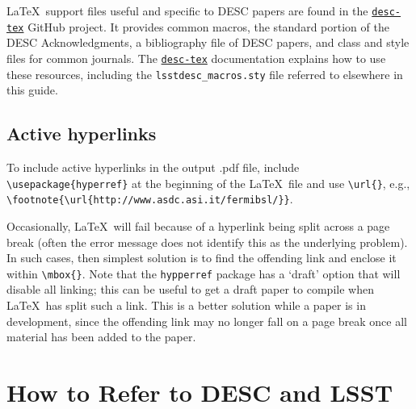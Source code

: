 \documentclass[letterpaper,11pt]{article}
\begin{document}
La\TeX\ support files useful and specific to DESC papers are found in
the \href{https://github.com/LSSTDESC/desc-tex}{\tt desc-tex} GitHub project.
It provides common macros, the standard portion of the DESC Acknowledgments, a bibliography file of DESC papers, and class and style files for common journals.
The \href{https://github.com/LSSTDESC/desc-tex}{\tt desc-tex} documentation explains how to use these resources, including the {\tt lsstdesc\_macros.sty} file referred to elsewhere in this guide.

\subsection{Active hyperlinks}

To include active hyperlinks in the output .pdf file, include 
\verb|\usepackage{hyperref}| at the beginning of the La\TeX\ file and use
\verb|\url{}|, e.g., \verb|\footnote{\url{http://www.asdc.asi.it/fermibsl/}}|.

Occasionally, La\TeX\ will fail because of a hyperlink being split across
a page break (often the error message does not identify this as the underlying problem). In such cases, then simplest solution is to find the
offending link and enclose it within \verb|\mbox{}|. Note that the {\tt hypperref} package has a `draft' option that will disable all linking; this can be useful to get a draft paper to compile when La\TeX\ has split such a link. This is a better solution while a paper is in development, since the offending link may no longer fall on a page break once all material has been added to the paper.

\section{How to Refer to DESC and LSST} 
\end{document}
